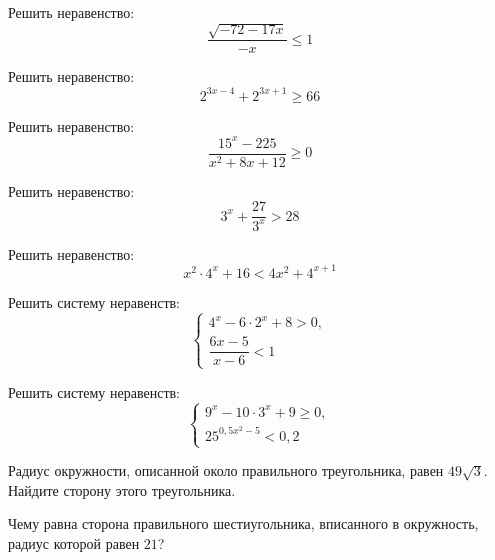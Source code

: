 \begin{homework}[number=1]
\begin{listofex}
	\end{listofex}
\end{homework}

\begin{homework}[number=2]
	\begin{listofex}
		\item Решить неравенство: \[ \dfrac{\sqrt{-72-17x}}{-x} \leq 1 \]
		\item Решить неравенство: \[ 2^{3x-4} +2^{3x+1} \ge 66 \]
		\item Решить неравенство: \[ \dfrac{15^x-225}{x^2+8x+12} \ge 0 \]
		\item Решить неравенство: \[ 3^x + \dfrac{27}{3^x} > 28 \]
		\item Решить неравенство: \[ x^2 \cdot 4^x + 16 < 4x^2 + 4^{x+1} \]
		\item Решить систему неравенств: 
		\[ \left\{
		\begin{array}{l}
			4^x-6 \cdot 2^x +8 >0, \\
			\dfrac{6x-5}{x-6} < 1
		\end{array}
		\right. \]
		\item Решить систему неравенств: 
		\[ \left\{
		\begin{array}{l}
			9^x - 10 \cdot 3^x + 9 \ge 0, \\
			25^{0,5x^2-5} < 0,2
		\end{array}
		\right. \]
		\item Радиус окружности, описанной около правильного треугольника, равен  \(49\sqrt{3}\). Найдите сторону этого треугольника.
		\item Чему равна сторона правильного шестиугольника, вписанного в окружность, радиус которой равен \(21\)?
	\end{listofex}
\end{homework}

